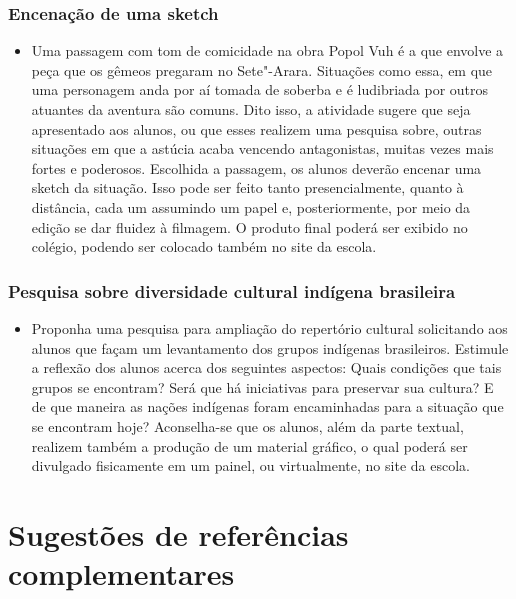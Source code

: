 \documentclass[12pt]{extarticle}
\begin{document}
\subsubsection{Encenação de uma sketch}



\begin{itemize}
\item
  Uma passagem com tom de comicidade na obra Popol Vuh é a que envolve a
  peça que os gêmeos pregaram no Sete"-Arara. Situações como essa, em que
  uma personagem anda por aí tomada de soberba e é ludibriada por outros
  atuantes da aventura são comuns. Dito isso, a atividade sugere que
  seja apresentado aos alunos, ou que esses realizem uma pesquisa sobre,
  outras situações em que a astúcia acaba vencendo antagonistas, muitas
  vezes mais fortes e poderosos. Escolhida a passagem, os alunos deverão
  encenar uma sketch da situação. Isso pode ser feito tanto
  presencialmente, quanto à distância, cada um assumindo um papel e,
  posteriormente, por meio da edição se dar fluidez à filmagem. O
  produto final poderá ser exibido no colégio, podendo ser colocado
  também no site da escola.
\end{itemize}

\subsubsection{Pesquisa sobre diversidade cultural indígena brasileira}



\begin{itemize}
\item
  Proponha uma pesquisa para ampliação do repertório cultural
  solicitando aos alunos que façam um levantamento dos grupos indígenas
  brasileiros. Estimule a reflexão dos alunos acerca dos seguintes
  aspectos: Quais condições que tais grupos se encontram? Será que há
  iniciativas para preservar sua cultura? E de que maneira as nações
  indígenas foram encaminhadas para a situação que se encontram hoje?
  Aconselha-se que os alunos, além da parte textual, realizem também a
  produção de um material gráfico, o qual poderá ser divulgado
  fisicamente em um painel, ou virtualmente, no site da escola.
\end{itemize}

\section{Sugestões de referências complementares}\label{sugestoes}
\end{document}

